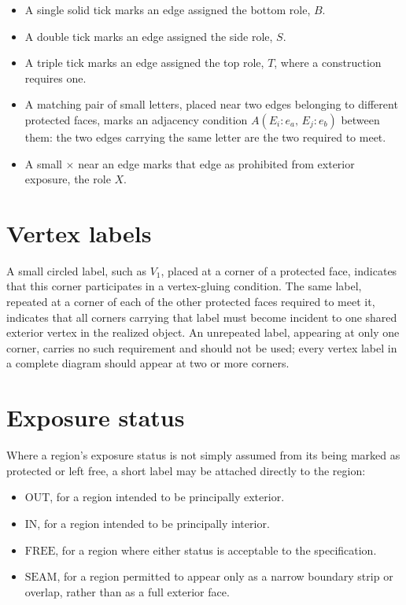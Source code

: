 \documentclass[11pt,oneside]{book}
\providecommand{\tightlist}{%
  \setlength{\itemsep}{0pt}\setlength{\parskip}{0pt}}
\begin{document}
\begin{itemize}
\tightlist
\item
  A single solid tick marks an edge assigned the bottom role, \(B\).
\item
  A double tick marks an edge assigned the side role, \(S\).
\item
  A triple tick marks an edge assigned the top role, \(T\), where a
  construction requires one.
\item
  A matching pair of small letters, placed near two edges belonging to
  different protected faces, marks an adjacency condition
  \(A(E_i{:}e_a,\, E_j{:}e_b)\) between them: the two edges carrying the
  same letter are the two required to meet.
\item
  A small \(\times\) near an edge marks that edge as prohibited from
  exterior exposure, the role \(X\).
\end{itemize}

\hypertarget{vertex-labels}{%
\section{Vertex labels}\label{vertex-labels}}

A small circled label, such as \(V_1\), placed at a corner of a
protected face, indicates that this corner participates in a
vertex-gluing condition. The same label, repeated at a corner of each of
the other protected faces required to meet it, indicates that all
corners carrying that label must become incident to one shared exterior
vertex in the realized object. An unrepeated label, appearing at only
one corner, carries no such requirement and should not be used; every
vertex label in a complete diagram should appear at two or more corners.

\hypertarget{exposure-status}{%
\section{Exposure status}\label{exposure-status}}

Where a region's exposure status is not simply assumed from its being
marked as protected or left free, a short label may be attached directly
to the region:

\begin{itemize}
\tightlist
\item
  \(\text{OUT}\), for a region intended to be principally exterior.
\item
  \(\text{IN}\), for a region intended to be principally interior.
\item
  \(\text{FREE}\), for a region where either status is acceptable to the
  specification.
\item
  \(\text{SEAM}\), for a region permitted to appear only as a narrow
  boundary strip or overlap, rather than as a full exterior face.
\end{itemize}
\end{document}
